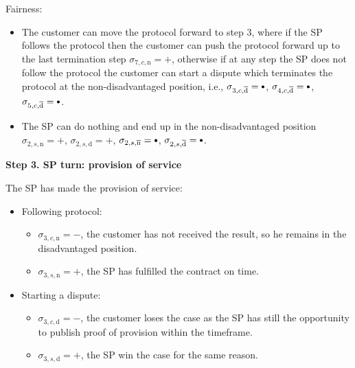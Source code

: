 \documentclass{ieeeaccess}
\newcommand\sbullet[1][.75]{\mathbin{\ThisStyle{\vcenter{\hbox{%
  \scalebox{#1}{$\SavedStyle\bullet$}}}}}%
}
\begin{document}
Fairness:

\begin{itemize}

\item
  The customer can move the protocol forward to step 3, where if the SP follows the protocol then the customer can push the protocol forward up to the last termination step \(\sigma_{7, c, \mathrm{n}} = +\), otherwise if at any step the SP does not follow the protocol the customer can start a dispute which terminates the protocol at the non-disadvantaged position, i.e., \(\sigma_{3, c, \overline{\mathrm{d}}} = \sbullet\), \(\sigma_{4, c, \overline{\mathrm{d}}} = \sbullet\), \(\sigma_{5, c, \overline{\mathrm{d}}} = \sbullet\).
\item
  The SP can do nothing and end up in the non-disadvantaged position \(\sigma_{2, s, \mathrm{n}} = +\), \(\sigma_{2, s, \mathrm{d}} = +\), \(\sigma_{2, s, \overline{\mathrm{n}}} = \sbullet\), \(\sigma_{2, s, \overline{\mathrm{d}}} = \sbullet\).
\end{itemize}

\noindent \textbf
{Step 3. SP turn: provision of service}\label{step-3-provision-of-service}

The SP has made the provision of service:

\begin{itemize}
\item
  Following protocol:

  \begin{itemize}
  
  \item
    \(\sigma_{3, c, \mathrm{n}} = -\), the customer has not received the result, so he remains in the disadvantaged position. 
  \item
    \(\sigma_{3, s, \mathrm{n}} = +\), the SP has fulfilled the contract on time.
  \end{itemize}
\item
  Starting a dispute:

  \begin{itemize}
  
  \item
    \(\sigma_{3, c, \mathrm{d}} = -\), the customer loses the case as the SP has still the opportunity to publish proof of provision within the timeframe. 
  \item
    \(\sigma_{3, s, \mathrm{d}} = +\), the SP win the case for the same reason.
  \end{itemize}
\end{itemize}
\end{document}
